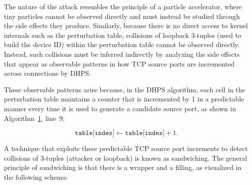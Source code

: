 \documentclass[twocolumn]{report}
\begin{document}
The nature of the attack resembles the principle of a \alert{particle accelerator}, where tiny particles cannot be observed directly and must instead be studied through the side effects they produce. Similarly, because there is no direct access to kernel internals such as the perturbation table, collisions of loopback 3-tuples (used to build the device ID) within the perturbation table \alert{cannot be observed directly}. Instead, such collisions must be inferred indirectly by analyzing the side effects that appear as observable patterns in how TCP source ports are incremented across connections by DHPS.

These observable patterns arise because, in the DHPS algorithm, each cell in the perturbation table maintains a counter that is incremented by 1 in a predictable manner every time it is used to generate a candidate source port, as shown in Algorithm~\hyperref[alg:dhps_port_selection]{1}, line~9:

\begin{minipage}{\columnwidth}
	\[
		\texttt{table[index]} \leftarrow \texttt{table[index]} + 1.
	\]
\end{minipage}

A technique that exploits these predictable TCP source port increments to detect collisions of 3-tuples (attacker or loopback) is known as \alert{sandwiching}. The general principle of sandwiching is that there is a \alert{wrapper} and a \alert{filling}, as visualized in the following schema:
\end{document}
